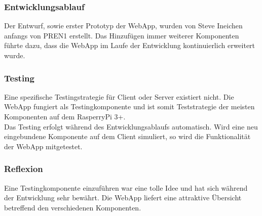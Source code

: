 \documentclass[../../main.tex]{subfiles}
\begin{document}
\pagebreak

\subsubsection{Entwicklungsablauf}
Der Entwurf, sowie erster Prototyp der WebApp, wurden von Steve Ineichen anfangs von PREN1 erstellt. Das Hinzufügen immer weiterer Komponenten führte dazu, dass die WebApp im Laufe der Entwicklung kontinuierlich erweitert wurde.

\subsubsection{Testing}
Eine spezifische Testingstrategie für Client oder Server existiert nicht. Die WebApp fungiert als Testingkomponente und ist somit Teststrategie der meisten Komponenten auf dem RasperryPi 3+.
\\
Das Testing erfolgt während des Entwicklungsablaufs automatisch. Wird eine neu eingebundene Komponente auf dem Client simuliert, so wird die Funktionalität der WebApp mitgetestet.

\subsubsection{Reflexion}
Eine Testingkomponente einzuführen war eine tolle Idee und hat sich während der Entwicklung sehr bewährt. Die WebApp liefert eine attraktive Übersicht betreffend den verschiedenen Komponenten.
\end{document}
